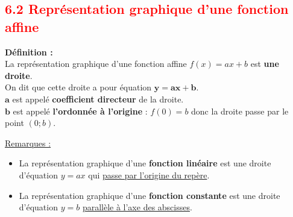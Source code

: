 \documentclass[12pt]{article}
\begin{document}
\newpage
\subsection*{\textcolor{red}{6.2 Représentation graphique d'une fonction affine}}

\vspace{5pt}

\begin{mdframed}[
    linewidth=1pt,
    roundcorner=5pt,
    linecolor=ForestGreen,
    innerbottommargin=10pt
]
{\color{ForestGreen}\textbf{Définition :}}
    \vspace{5pt}
    \\La représentation graphique d'une fonction affine $f(x) = ax + b$ est \textbf{une droite}.
    \vspace{5pt}
    \\On dit que cette droite a pour équation $\bm{y = ax + b}$.
    \vspace{5pt}
    \\$\bm{a}$ est appelé \textbf{coefficient directeur} de la droite.
    \vspace{5pt}
    \\$\bm{b}$ est appelé \textbf{l'ordonnée à l'origine} : $f(0) = b$ donc la droite passe par le point
    $(0;b)$.
\end{mdframed}

\underline{Remarques :}
\vspace{5pt}
\begin{itemize}
    \item La représentation graphique d’une \textbf{fonction linéaire} est une droite d’équation 
    $y = ax$ qui \underline{passe par l’origine du repère}.
    \vspace{5pt}
    \item La représentation graphique d’une \textbf{fonction constante} est une droite d’équation
    $y = b$ \underline{parallèle à l’axe des abscisses}.
\end{itemize}

\vspace{10pt}
\end{document}
